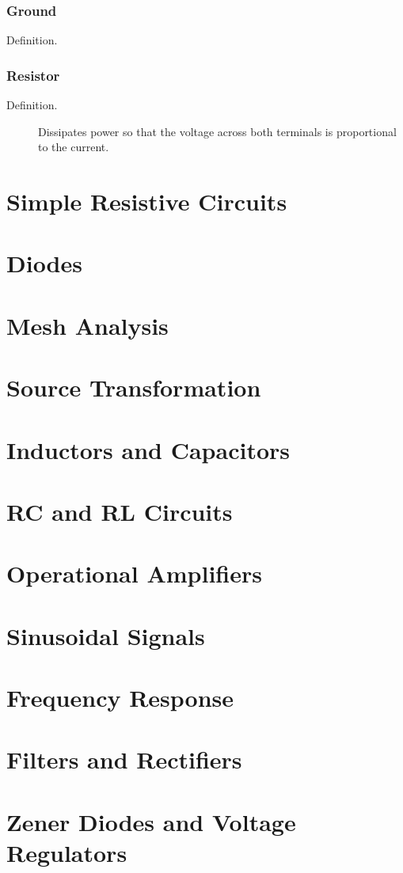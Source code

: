 \documentclass{article}
\begin{document}
\subsubsection{Ground}
\begin{description}
    \item[Definition.] 
\end{description}
\subsubsection{Resistor}
\begin{description}
    \item[Definition.] Dissipates power so that the voltage across both terminals is proportional to the current.
\end{description}
\newpage
\section{Simple Resistive Circuits}
\newpage
\section{Diodes}
\newpage
\section{Mesh Analysis}
\newpage
\section{Source Transformation}
\newpage
\section{Inductors and Capacitors}
\newpage
\section{RC and RL Circuits}
\newpage
\section{Operational Amplifiers}
\newpage
\section{Sinusoidal Signals}
\newpage
\section{Frequency Response}
\newpage
\section{Filters and Rectifiers}
\newpage
\section{Zener Diodes and Voltage Regulators}
\newpage
\end{document}
